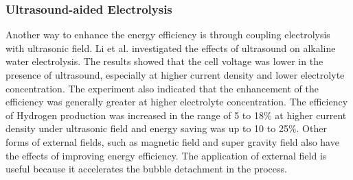 \subsubsection{Ultrasound-aided Electrolysis}
Another way to enhance the energy efficiency is through coupling electrolysis with ultrasonic field. Li et al.\cite{ultrasound} investigated the effects of ultrasound on alkaline water electrolysis. The results showed that the cell voltage was lower in the presence of ultrasound,
especially at higher current density and lower electrolyte concentration. The experiment also indicated that the enhancement of the efficiency was generally greater at higher electrolyte concentration. The efficiency of Hydrogen production was increased in the range of 5 to 18\% at higher current density under ultrasonic field and energy saving was up to 10 to 25\%. Other forms of external fields, such as magnetic field and super gravity field also have the effects of improving energy efficiency. The application of external field is useful because it accelerates the bubble detachment in the process. \cite{review}



